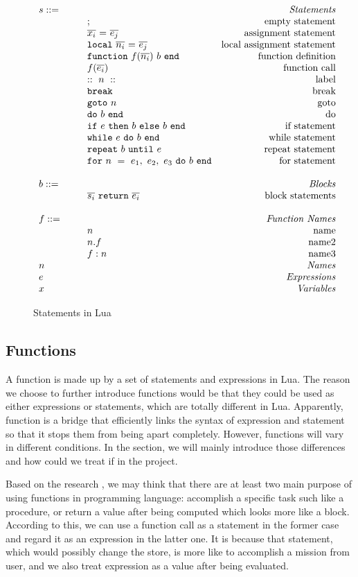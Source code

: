 \documentclass{article}
\begin{document}
\begin{figure}
\caption{Statements in Lua}
\label{fig:LuaStat}
\[
\begin{array}{llr}
  \mydefhead{s ::=\qquad\qquad\qquad\qquad}{Statements}
  \mydefcase{;}{empty statement}
  \mydefcase{\assign x e}{assignment statement}
  \mydefcase{\local n e}{local assignment statement}
  \mydefcase{\function f n b}{function definition}
  \mydefcase{f(\overline{e_i})}{function call}
  \mydefcase{::~n~::}{label}
  \mydefcase{\tt break}{break}
  \mydefcase{{\tt goto} ~n}{goto}
  \mydefcase{\doe b}{do}
  \mydefcase{\ife e b b}{if statement}
  \mydefcase{\whilee e b}{while statement}
  \mydefcase{\repeate e b}{repeat statement}
  \mydefcase{\for n e b}{for statement}
  \\
  \mydefhead{b ::=\qquad\qquad\qquad\qquad}{Blocks}
  \mydefcase{\overline{s_i}~{\tt return}~\overline{e_i}}{block statements}
  \\
  \mydefhead{f ::=\qquad\qquad\qquad\qquad}{Function Names}
  \mydefcase{n}{name}
  \mydefcase{n.f}{name2}
  \mydefcase{f:n}{name3}
  \mydefhead{n \qquad\qquad\qquad\qquad}{Names}
  \mydefhead{e \qquad\qquad\qquad\qquad}{Expressions}
  \mydefhead{x \qquad\qquad\qquad\qquad}{Variables}
\end{array}
\]
\end{figure}

\subsection{Functions}
A function is made up by a set of statements and expressions in Lua. The reason we choose to further introduce functions would be that they could be used as either expressions or statements, which are totally different in Lua. Apparently, function is a bridge that efficiently links the syntax of expression and statement so that it stops them from being apart completely. However, functions will vary in different conditions. In the section, we will mainly introduce those differences and how could we treat if in the project.

Based on the research \cite{PIL}, we may think that there are at least two main purpose of using functions in programming language: accomplish a specific task such like a procedure, or return a value after being computed which looks more like a block. According to this, we can use a function call as a statement in the former case and regard it as an expression in the latter one. It is because that statement, which would possibly change the store, is more like to accomplish a mission from user, and we also treat expression as a value after being evaluated.
\end{document}
